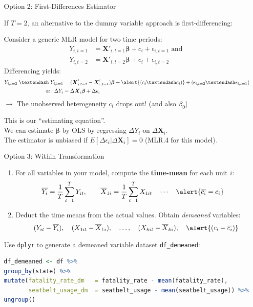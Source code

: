 \documentclass[9pt,aspectratio=169]{beamer}
\begin{document}
\begin{frame}{Option 2: First-Differences Estimator}
\linespread{1.3}\selectfont %

If $T = 2$, an alternative to the dummy variable approach is first-differencing:

Consider a generic MLR model for two time periods:
\begin{align*}
    Y_{i, t=1}& = \boldsymbol{X}'_{i, t=1}\boldsymbol{\beta} + c_i + \epsilon_{i, t=1}  \text{ and  } \\
Y_{i, t=2} &= \boldsymbol{X}'_{i, t=2}\boldsymbol{\beta} + c_i + \epsilon_{i, t=2}   
\end{align*}
\pause
Differencing yields: 
\begin{align*}
Y_{i, t=2} \;– \; Y_{i, t=1} &= (\boldsymbol{X}'_{i, t=2} - \boldsymbol{X}'_{i, t=1}) \boldsymbol{\beta} + \alert{(c_i – c_i)} + (\epsilon_{i, t=2} – \epsilon_{i, t=1}) \\
\text{ or: } \Delta Y_i &= \Delta \boldsymbol{X}_{i} \boldsymbol{\beta} + \Delta\epsilon_i
\end{align*}
\pause
$\rightarrow$ The unobserved heterogeneity \alert{$c_i$} drops out! (and also $\beta_0$)

\pause 
This is our “estimating equation”. \\
We can estimate $\boldsymbol{\beta}$ by OLS by regressing $\Delta Y_i$ on $\Delta \boldsymbol{X}_i$. \\
The estimator is unbiased if $E[\Delta\epsilon_i|\Delta \boldsymbol{X}_{i}] = 0$ (MLR.4 for this model).
\end{frame}


\begin{frame}[fragile]{Option 3: Within Transformation}
\begin{enumerate}
    \item For all variables in your model, compute the \textbf{time-mean} for each unit $i$:
    \[
    \overline{Y_{i}} = \frac{1}{T} \sum_{t=1}^T Y_{it}, 
    \qquad 
    \overline{X}_{1i} = \frac{1}{T} \sum_{t=1}^T X_{1it} \quad \cdots \quad \alert{\overline{c_{i}} = c_i}
    \]
    \pause
    \item Deduct the time means from the actual values.  
    Obtain \textit{demeaned} variables:  
    \[\quad (Y_{it}-\overline{Y_{i}}),\quad (X_{1it}-\overline{X}_{1i}),\quad \ldots,\quad (X_{kit}-\overline{X}_{ki}), \quad \alert{(c_i - \overline{c_{i}})} \]
\end{enumerate}
\pause
Use \texttt{dplyr} to generate a demeaned variable dataset \texttt{df\_demeaned}:
\begin{lstlisting}[language=R]
df_demeaned <- df %>%
group_by(state) %>%
mutate(fatality_rate_dm   = fatality_rate - mean(fatality_rate),
       seatbelt_usage_dm  = seatbelt_usage - mean(seatbelt_usage)) %>%
ungroup()
\end{lstlisting}
\end{frame}
\end{document}
